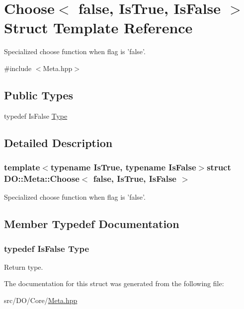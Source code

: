 \hypertarget{struct_d_o_1_1_meta_1_1_choose_3_01false_00_01_is_true_00_01_is_false_01_4}{\section{Choose$<$ false, Is\-True, Is\-False $>$ Struct Template Reference}
\label{struct_d_o_1_1_meta_1_1_choose_3_01false_00_01_is_true_00_01_is_false_01_4}
}


Specialized choose function when flag is 'false'.  




{\ttfamily \#include $<$Meta.\-hpp$>$}

\subsection*{Public Types}
\begin{DoxyCompactItemize}
\item 
typedef Is\-False \hyperlink{struct_d_o_1_1_meta_1_1_choose_3_01false_00_01_is_true_00_01_is_false_01_4_a9ee7a1ba5a50997b3354cdd0a79774aa}{Type}
\end{DoxyCompactItemize}


\subsection{Detailed Description}
\subsubsection*{template$<$typename Is\-True, typename Is\-False$>$struct D\-O\-::\-Meta\-::\-Choose$<$ false, Is\-True, Is\-False $>$}

Specialized choose function when flag is 'false'. 

\subsection{Member Typedef Documentation}
\hypertarget{struct_d_o_1_1_meta_1_1_choose_3_01false_00_01_is_true_00_01_is_false_01_4_a9ee7a1ba5a50997b3354cdd0a79774aa}{
\subsubsection[{Type}]{\setlength{\rightskip}{0pt plus 5cm}typedef Is\-False {\bf Type}}}\label{struct_d_o_1_1_meta_1_1_choose_3_01false_00_01_is_true_00_01_is_false_01_4_a9ee7a1ba5a50997b3354cdd0a79774aa}
Return type. 

The documentation for this struct was generated from the following file\-:\begin{DoxyCompactItemize}
\item 
src/\-D\-O/\-Core/\hyperlink{_meta_8hpp}{Meta.\-hpp}\end{DoxyCompactItemize}
